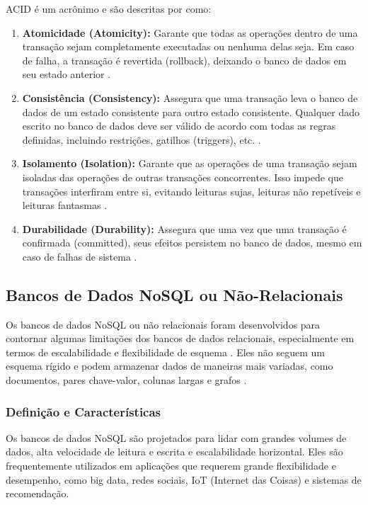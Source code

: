 ACID é um acrônimo e são descritas por \cite{gray_reuter1992}  como:

\begin{enumerate}
    \item \textbf{Atomicidade (Atomicity):} Garante que todas as operações dentro de uma transação sejam completamente executadas ou nenhuma delas seja. Em caso de falha, a transação é revertida (rollback), deixando o banco de dados em seu estado anterior \cite{gray_reuter1992}.
    \item \textbf{Consistência (Consistency):} Assegura que uma transação leva o banco de dados de um estado consistente para outro estado consistente. Qualquer dado escrito no banco de dados deve ser válido de acordo com todas as regras definidas, incluindo restrições, gatilhos (triggers), etc. \cite{gray_reuter1992}.
    \item \textbf{Isolamento (Isolation):} Garante que as operações de uma transação sejam isoladas das operações de outras transações concorrentes. Isso impede que transações interfiram entre si, evitando leituras sujas, leituras não repetíveis e leituras fantasmas \cite{gray_reuter1992}.
    \item \textbf{Durabilidade (Durability):} Assegura que uma vez que uma transação é confirmada (committed), seus efeitos persistem no banco de dados, mesmo em caso de falhas de sistema \cite{gray_reuter1992}.
\end{enumerate}

\subsection{Bancos de Dados NoSQL ou Não-Relacionais}

Os bancos de dados NoSQL ou não relacionais foram desenvolvidos para contornar algumas limitações dos bancos de dados relacionais, especialmente em termos de escalabilidade e flexibilidade de esquema \cite{cattell2011}. Eles não seguem um esquema rígido e podem armazenar dados de maneiras mais variadas, como documentos, pares chave-valor, colunas largas e grafos  \cite{cattell2011}.

\subsubsection{Definição e Características}

Os bancos de dados NoSQL são projetados para lidar com grandes volumes de dados, alta velocidade de leitura e escrita e escalabilidade horizontal. Eles são frequentemente utilizados em aplicações que requerem grande flexibilidade e desempenho, como big data, redes sociais, IoT (Internet das Coisas) e sistemas de recomendação.

